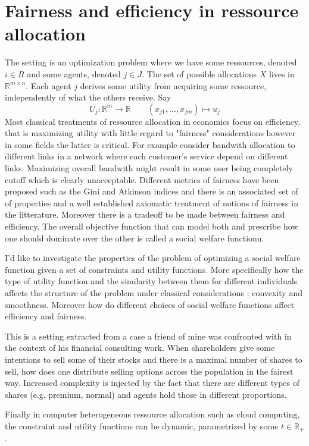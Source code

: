 \section*{Fairness and efficiency in ressource allocation}
The setting is an optimization problem where we have some
ressources, denoted $i\in R$ and some agents, denoted $j\in J$.
The set of possible allocations $X$ lives in $\mathbb R^{m\times n}$.
Each agent $j$ derives some utility from acquiring some ressource, 
independently of what the others receive.
Say \begin{equation} U_j: \mathbb R^{m} \longrightarrow \mathbb R
\qquad (x_{j1},\ldots,x_{jm})\mapsto u_j\end{equation}
Most classical treatments of ressource allocation in economics focus on
efficiency, that is maximizing utility with little regard to "fairness"
considerations however in some fields the latter is critical.  For example
consider bandwith allocation to different links in a network where each
customer's service depend on different links. Maximizing overall bandwith
might result in some user being completely cutoff which is clearly
unacceptable. Different metrics of fairness have been proposed such as the
Gini and Atkinson indices and there is an associated set of
of properties and a well established axiomatic treatment of notions
of fairness in the litterature.
Moreover there is a tradeoff to be made between fairness and efficiency.
The overall objective function that can model both and prescribe
how one should dominate over the other is called a social welfare functionn.

I'd like to investigate the properties of the problem of optimizing a social
welfare function given a set of constraints and utility functions. More
specifically how the type of utility function and the similarity between them
for different individuals affects the structure of the problem under
classical considerations : convexity and smoothness. Moreover how 
do different choices of social welfare functions affect efficiency and 
fairness.

This is a setting extracted from a case a friend of mine was confronted with 
in the context of his financial consulting work.
When shareholders give some intentions to sell some of their stocks and
there is a maximal number of shares to sell, how does one distribute selling
options across the population in the fairest way. Increased complexity
is injected by the fact that there are different types of shares (e.g.
premium, normal) and agents hold those in different proportions.

Finally in computer heterogeneous  ressource allocation such as cloud computing,
the constraint and utility functions can be dynamic, parametrized by some 
$t\in \mathbb R_+$.



